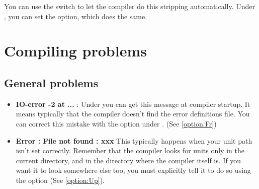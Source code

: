 \documentclass{report}
\newcommand{\seeo}[1]{See \ref{option:#1}}
\begin{document}
You can use the  switch to let the compiler do this stripping
automatically. Under \linux, you can set the  option, which does
the same.

\chapter{Compiling problems}

\section{General problems}
\begin{itemize}
\item \textbf{IO-error -2 at ...} : Under \linux you can get this message at
compiler startup. It means typically that the compiler doesn't find the
error definitions file. You can correct this mistake with the 
option under \linux. (\seeo{Fr})
\item \textbf {Error : File not found : xxx} This typically happens when
your unit path isn't set correctly. Remember that the compiler looks for
units only in the current directory, and in the directory where the compiler
itself is. If you want it to look somewhere else too, you must explicitly
tell it to do so using the  option (\seeo{Up}).
\end{itemize}

\end{document}
